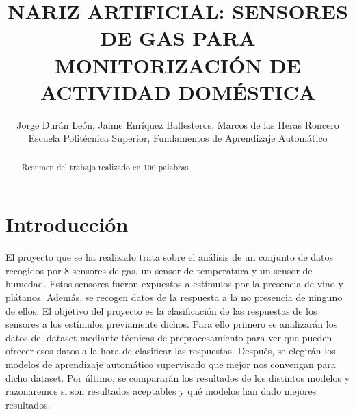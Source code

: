 \documentclass{esannV2}
\begin{document}
\title{NARIZ ARTIFICIAL: SENSORES DE GAS PARA MONITORIZACIÓN DE ACTIVIDAD DOMÉSTICA}

\author{Jorge Durán León, Jaime Enríquez Ballesteros, Marcos de las Heras Roncero
%
%
\vspace{.3cm}\\
%
  Escuela Politécnica Superior, Fundamentos de Aprendizaje Automático \\
%
}

\maketitle

\begin{abstract}
Resumen del trabajo realizado en 100 palabras.
\end{abstract}

\section{Introducción}

El proyecto que se ha realizado trata sobre el análisis de un conjunto de datos recogidos por 8 sensores de gas, un sensor de temperatura y un sensor de humedad. Estos sensores fueron expuestos a estímulos por la presencia de vino y plátanos. Además, se recogen datos de la respuesta a la no presencia de ninguno de ellos. El objetivo del proyecto es la clasificación de las respuestas de los sensores a los estímulos previamente dichos. Para ello primero se analizarán los datos del dataset mediante técnicas de preprocesamiento para ver que pueden ofrecer esos datos a la hora de clasificar las respuestas. Después, se elegirán los modelos de aprendizaje automático supervisado que mejor nos convengan para dicho dataset. Por último, se compararán los resultados de los distintos modelos y razonaremos si son resultados aceptables y qué modelos han dado mejores resultados.
\end{document}
